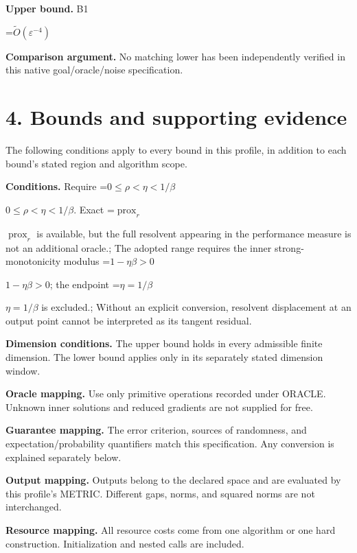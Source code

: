 \documentclass[10pt,a4paper]{article}
\newcommand{\AtlasMath}[1]{\par\begingroup\centering\setbox0=\hbox{$\displaystyle #1$}\ifdim\wd0>1.4\linewidth\typeout{ATLAS WIDE FORMULA: \the\wd0}\fi\ifdim\wd0>\linewidth\resizebox{\linewidth}{!}{\box0}\else\box0\fi\par\endgroup}
\newcommand{\AtlasInlineMath}[1]{\begingroup\setbox0=\hbox{$#1$}\ifdim\wd0>.4\linewidth\endgroup\AtlasMath{#1}\else\endgroup$#1$\fi}
\begin{document}
\textbf{Upper bound.} B1



\AtlasMath{\widetilde{O}(\varepsilon^{-4})}


\textbf{Comparison argument.} No matching lower has been independently verified in this native goal/oracle/noise specification.



\section{4. Bounds and supporting evidence}


The following conditions apply to every bound in this profile, in addition to each bound's stated region and algorithm scope.



\textbf{Conditions.} Require \AtlasInlineMath{0\le\rho<\eta<1/\beta}. Exact \AtlasInlineMath{\operatorname{prox}_r} is available, but the full resolvent appearing in the performance measure is not an additional oracle.; The adopted range requires the inner strong-monotonicity modulus \AtlasInlineMath{1-\eta\beta>0}; the endpoint \AtlasInlineMath{\eta=1/\beta} is excluded.; Without an explicit conversion, resolvent displacement at an output point cannot be interpreted as its tangent residual.



\textbf{Dimension conditions.} The upper bound holds in every admissible finite dimension. The lower bound applies only in its separately stated dimension window.



\textbf{Oracle mapping.} Use only primitive operations recorded under ORACLE. Unknown inner solutions and reduced gradients are not supplied for free.



\textbf{Guarantee mapping.} The error criterion, sources of randomness, and expectation/probability quantifiers match this specification. Any conversion is explained separately below.



\textbf{Output mapping.} Outputs belong to the declared space and are evaluated by this profile's METRIC. Different gaps, norms, and squared norms are not interchanged.



\textbf{Resource mapping.} All resource costs come from one algorithm or one hard construction. Initialization and nested calls are included.
\end{document}
